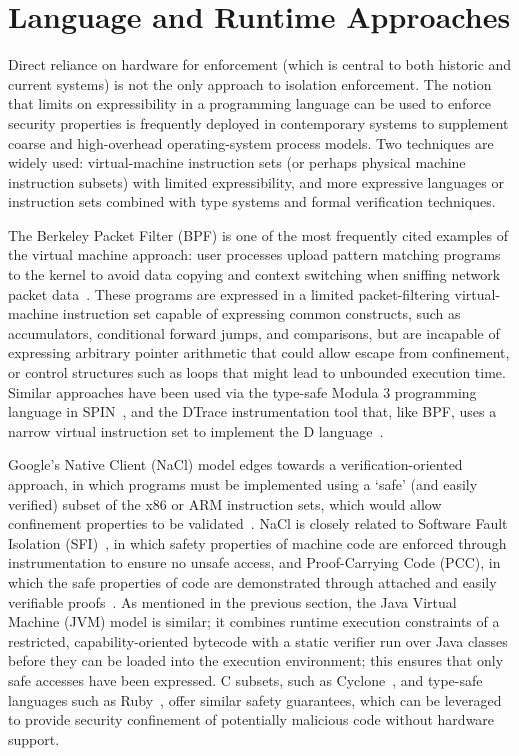 \section{Language and Runtime Approaches} %

Direct reliance on hardware for enforcement (which is central to both historic
and current systems) is not the only approach to isolation enforcement.
The notion that limits on expressibility in a programming language can be used to
enforce security properties is frequently deployed in contemporary systems to
supplement coarse and high-overhead operating-system process models.
Two techniques are widely used: virtual-machine instruction sets (or perhaps physical
machine instruction subsets) with limited expressibility, and more expressive languages
or instruction sets combined with type systems and formal verification techniques.

The Berkeley Packet Filter (BPF) is one of the most frequently cited
examples of the virtual machine approach: user processes upload pattern matching programs
to the kernel to avoid data copying and context switching when sniffing network packet
data~\cite{mccanne:bpf}.
These programs are expressed in a limited packet-filtering virtual-machine instruction
set capable of expressing common constructs, such as accumulators, conditional forward
jumps, and comparisons, but are incapable of expressing arbitrary pointer arithmetic that
could allow escape from confinement, or control structures such as loops that might lead
to unbounded execution time.
Similar approaches have been used via the type-safe Modula 3 programming language in
SPIN~\cite{bershad:spin}, and the DTrace instrumentation tool that, like BPF, uses a narrow
virtual instruction set to implement the D language~\cite{cantrill:dtrace}.

Google's Native Client (NaCl) model edges towards a verification-oriented approach, in which
programs must be implemented using a `safe' (and easily verified) subset of the x86 or ARM
instruction sets, which would allow confinement properties to be validated~\cite{yee:nativeclient}.
NaCl is closely related to Software Fault Isolation (SFI)~\cite{wahbe:sfi}, in which safety
properties of machine code are enforced through instrumentation to ensure no unsafe access,
and Proof-Carrying Code (PCC), in which the safe properties of code are demonstrated through
attached and easily verifiable proofs~\cite{necula:pcc}.
As mentioned in the previous section, the
Java Virtual Machine (JVM) model is similar;
it combines runtime execution constraints of a
restricted, capability-oriented bytecode with a static verifier run over
Java classes before they can be loaded into the execution environment; this
 ensures that only safe accesses have been expressed.
C subsets, such as Cyclone~\cite{trevor:cyclone}, and type-safe languages such as
Ruby~\cite{ruby}, offer similar safety guarantees, which can be leveraged to provide
security confinement of potentially malicious code without hardware support.

